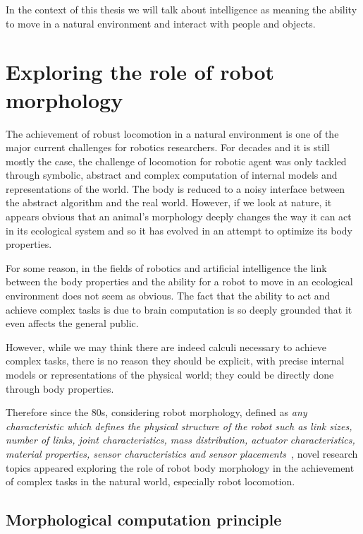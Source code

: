 In the context of this thesis we will talk about intelligence  as meaning the ability to move in a natural environment and interact with people and objects.



\section{Exploring the role of robot morphology} %

The achievement of robust locomotion in a natural environment is one of the major current challenges for robotics researchers. For decades and it is still mostly the case, the challenge of locomotion for robotic agent was only tackled through symbolic, abstract and complex computation of internal models and representations of the world. The body is reduced to a noisy interface between the abstract algorithm and the real world.
However, if we look at nature, it appears obvious that an animal’s morphology deeply changes the way it can act in its ecological system and so it has evolved in an attempt to optimize its body properties.

For some reason, in the fields of robotics and artificial intelligence the link between the body properties and the ability for a robot to move in an ecological environment does not seem as obvious. The fact that the ability to act and achieve complex tasks is due to brain computation is so deeply grounded that it even affects the general public.

However, while we may think there are indeed calculi necessary to achieve complex tasks, there is no reason they should be explicit, with precise internal models or representations of the physical world; they could be directly done through body properties.

Therefore since the 80s, considering robot morphology, defined as \emph{any characteristic which defines the physical structure of the robot such as link sizes, number of links, joint characteristics, mass distribution, actuator characteristics, material properties, sensor characteristics and sensor placements}~\cite{paul2006morphological}, novel research topics appeared exploring the role of robot body morphology in the achievement of complex tasks in the natural world, especially robot locomotion.


\subsection{Morphological computation principle} %

